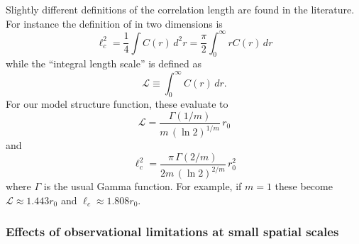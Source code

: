 \documentclass[fleqn,usenatbib, useAMS, a4paper]{mnras}
\begin{document}
\newcommand\LL{\ensuremath{\mathcal{L}}}
Slightly different definitions of the correlation length
are found in the literature.
For instance the definition of \citet{Jaupart:2022i}
in two dimensions is
\begin{equation}
  \label{eq:2}
  \ell_c^2 = \frac{1}{4} \int C(r) \, d^2 r
  = \frac{\pi}{2} \int_0^\infty r C(r) \, d r
\end{equation}
while the ``integral length scale'' \citep{Pope:2000p} is defined
as
\begin{equation}
  \label{eq:3}
  \LL \equiv \int_0^\infty C(r)\, dr .
\end{equation}
For our model structure function, these evaluate to
\begin{equation}
  \label{eq:4}
  \LL = \frac{\Gamma(1/m)}{m\, (\ln 2)^{1/m}} \, r_0
\end{equation}
and
\begin{equation}
  \label{eq:4}
   \ell_c^2 = \frac{\pi\,  \Gamma(2/m)}{2m\, (\ln 2)^{2/m}} \, r_0^2
\end{equation}
where \(\Gamma\) is the usual Gamma function.
For example, if \(m = 1\) these become \(\LL \approx 1.443 r_0\)
and \(\ell_c \approx 1.808 r_0\). 

\subsubsection{Effects of observational limitations at small spatial scales}
\label{sec:effect-observ-limit}
\end{document}
